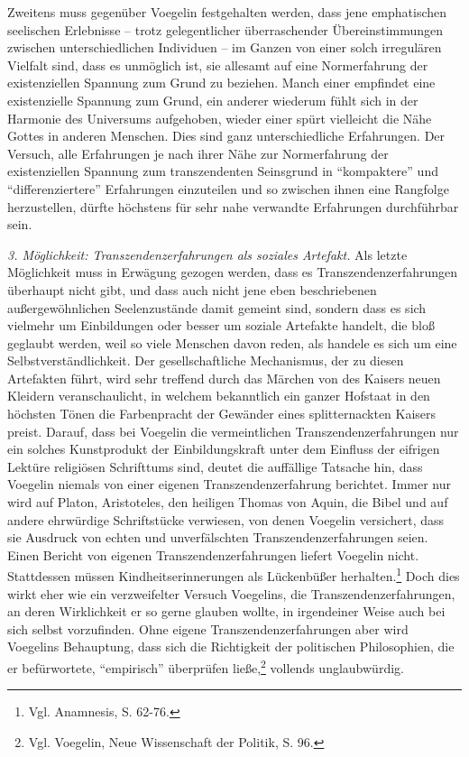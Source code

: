 Zweitens muss gegenüber Voegelin festgehalten werden, dass jene emphatischen
seelischen Erlebnisse -- trotz gelegentlicher überraschender Übereinstimmungen
zwischen unterschiedlichen Individuen -- im Ganzen von einer solch irregulären
Vielfalt sind, dass es unmöglich ist, sie allesamt auf eine Normerfahrung der
existenziellen Spannung zum Grund zu beziehen. Manch einer empfindet eine
existenzielle Spannung zum Grund, ein anderer wiederum fühlt sich in
der Harmonie des Universums aufgehoben, wieder einer spürt vielleicht die
Nähe Gottes in anderen Menschen. Dies sind ganz unterschiedliche Erfahrungen.
Der Versuch, alle Erfahrungen je nach ihrer Nähe zur Normerfahrung der
existenziellen Spannung zum transzendenten Seinsgrund in "`kompaktere"' und
"`differenziertere"' Erfahrungen einzuteilen und so zwischen ihnen eine
Rangfolge herzustellen, dürfte höchstens für sehr nahe verwandte Erfahrungen
durchführbar sein.

{\it 3. Möglichkeit: Transzendenzerfahrungen als soziales Artefakt.} Als
letzte Möglichkeit muss in Erwägung gezogen werden, dass es
Transzendenzerfahrungen überhaupt nicht gibt, und dass auch nicht jene eben
beschriebenen außergewöhnlichen Seelenzustände damit gemeint sind, sondern dass
es sich vielmehr um Einbildungen oder besser um soziale Artefakte handelt, die
bloß geglaubt werden, weil so viele Menschen davon reden, als handele es sich
um eine Selbstverständlichkeit. Der gesellschaftliche Mechanismus, der zu
diesen Artefakten führt, wird sehr treffend durch das Märchen von des Kaisers
neuen Kleidern veranschaulicht, in welchem bekanntlich ein ganzer Hofstaat in
den höchsten Tönen die Farbenpracht der Gewänder eines splitternackten Kaisers
preist. Darauf, dass bei Voegelin die vermeintlichen Transzendenzerfahrungen
nur ein solches Kunstprodukt der Einbildungskraft unter dem Einfluss der
eifrigen Lektüre religiösen Schrifttums sind, deutet die auf\/fällige Tatsache
hin, dass Voegelin niemals von einer eigenen Transzendenzerfahrung berichtet.
Immer nur wird auf Platon, Aristoteles, den heiligen Thomas von Aquin, die
Bibel und auf andere ehrwürdige Schriftstücke verwiesen, von denen Voegelin
versichert, dass sie Ausdruck von echten und unverfälschten
Transzendenzerfahrungen seien. Einen Bericht von eigenen
Transzendenzerfahrungen liefert Voegelin nicht.  Stattdessen müssen
Kindheitserinnerungen als Lückenbüßer herhalten.\footnote{Vgl. Anamnesis, S.
  62-76.} Doch dies wirkt eher wie ein verzweifelter Versuch Voegelins, die
Transzendenzerfahrungen, an deren Wirklichkeit er so gerne glauben wollte, in
irgendeiner Weise auch bei sich selbst vorzufinden. Ohne eigene
Transzendenzerfahrungen aber wird Voegelins Behauptung, dass sich die
Richtigkeit der politischen Philosophien, die er befürwortete, "`empirisch"'
überprüfen ließe,\footnote{Vgl. Voegelin, Neue Wissenschaft der Politik, S.
  96.} vollends unglaubwürdig.

